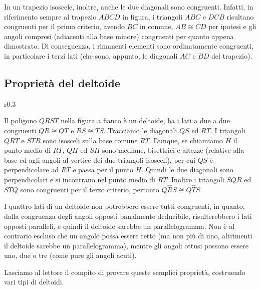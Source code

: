 In un trapezio isoscele, inoltre, anche le due diagonali sono 
congruenti. Infatti, in riferimento sempre al trapezio $ABCD$ in 
figura, i triangoli $ABC$ e $DCB$ risultano congruenti per il primo 
criterio, avendo $BC$ in comune, $AB\cong CD$ per ipotesi e gli 
angoli compresi (adiacenti alla base minore) congruenti per quanto 
appena dimostrato. Di conseguenza, i rimanenti elementi sono 
ordinatamente congruenti, in particolare i terzi lati (che sono, 
appunto, le diagonali $AC$ e $BD$ del trapezio).

\subsection{Proprietà del deltoide}

\begin{wrapfigure}{r}{0.3\textwidth}
  \centering
\end{wrapfigure}
Il poligono $QRST$ nella figura a fianco è un deltoide, ha i lati a 
due a due congruenti $QR\cong QT$ e $RS\cong TS$. Tracciamo le 
diagonali $QS$ ed $RT$. I triangoli $QRT$ e $STR$ sono isosceli sulla 
base comune $RT$. Dunque, se chiamiamo $H$ il punto medio di $RT$, 
$QH$ ed $SH$ sono mediane, bisettrici e altezze (relative alla base 
ed agli angoli al vertice dei due triangoli isosceli), per cui $QS$ è 
perpendicolare ad $RT$ e passa per il punto $H$. Quindi le due 
diagonali sono perpendicolari e si incontrano nel punto medio di 
$RT$. Inoltre i triangoli $SQR$ ed $STQ$ sono congruenti per il terzo 
criterio, pertanto $Q\widehat{R}S\cong Q\widehat{T}S$.

I quattro lati di un deltoide non potrebbero essere tutti congruenti, 
in quanto, dalla congruenza degli angoli opposti banalmente 
deducibile, risulterebbero i lati opposti paralleli, e quindi il 
deltoide sarebbe un parallelogramma. Non è al contrario escluso che 
un angolo possa essere retto (ma non più di uno, altrimenti il 
deltoide sarebbe un parallelogramma), mentre gli angoli ottusi possono 
essere uno, due o tre (come pure gli angoli acuti).

Lasciamo al lettore il compito di provare queste semplici proprietà, 
costruendo vari tipi di deltoidi.

